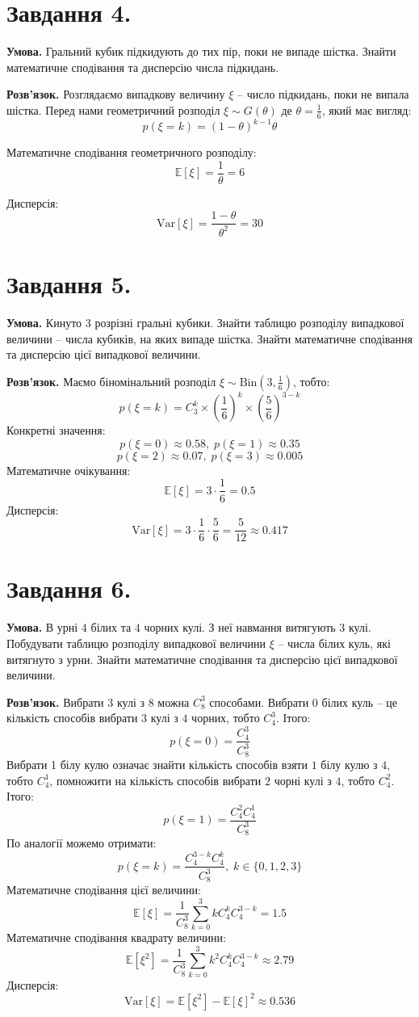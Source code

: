\documentclass[14pt]{extarticle}
\begin{document}
\section*{Завдання 4.}
\textbf{Умова.} Гральний кубик підкидують до тих пір, поки не випаде шістка. Знайти математичне сподівання та дисперсію числа підкидань.

\textbf{Розв'язок.} Розглядаємо випадкову величину $\xi$ -- число підкидань, поки не випала шістка. Перед нами геометричний розподіл $\xi \sim G(\theta)$ де $\theta=\frac{1}{6}$, який має вигляд:
\[
p(\xi = k) = (1-\theta)^{k-1}\theta
\]

Математичне сподівання геометричного розподілу:
\[
\mathbb{E}[\xi] = \frac{1}{\theta} = 6
\]

Дисперсія:
\[
\text{Var}[\xi] = \frac{1-\theta}{\theta^2} = 30
\]

\section*{Завдання 5.}
\textbf{Умова.} Кинуто 3 розрізні гральні кубики. Знайти таблицю розподілу випадкової величини -- числа кубиків, на яких випаде шістка. Знайти математичне сподівання та дисперсію цієї випадкової величини.

\textbf{Розв'язок.} Маємо біномінальний розподіл $\xi \sim \text{Bin}\left(3,\frac{1}{6}\right)$, тобто:
\[
p(\xi = k) = C_3^k \times \left(\frac{1}{6}\right)^k \times \left(\frac{5}{6}\right)^{3-k}
\]
Конкретні значення:
\[
p(\xi=0) \approx 0.58, \; p(\xi=1)\approx 0.35
\]
\[
p(\xi=2) \approx 0.07, \; p(\xi=3)\approx 0.005
\]
Математичне очікування:
\[
\mathbb{E}[\xi] = 3 \cdot \frac{1}{6} = 0.5
\]
Дисперсія:
\[
\text{Var}[\xi] = 3 \cdot \frac{1}{6} \cdot \frac{5}{6} = \frac{5}{12} \approx 0.417
\]

\section*{Завдання 6.}
\textbf{Умова.} В урні 4 білих та 4 чорних кулі. З неї навмання витягують 3 кулі. Побудувати таблицю розподілу випадкової величини $\xi$ – числа білих куль, які витягнуто з урни. Знайти математичне сподівання та дисперсію цієї випадкової величини.

\textbf{Розв'язок.} Вибрати $3$ кулі з $8$ можна $C_8^3$ способами. Вибрати $0$ білих куль -- це кількість способів вибрати $3$ кулі з $4$ чорних, тобто $C_{4}^3$. Ітого:
\[
p(\xi = 0) = \frac{C_{4}^3}{C_{8}^3}
\]
Вибрати 1 білу кулю означає знайти кількість способів взяти $1$ білу кулю з $4$, тобто $C_{4}^1$, помножити на кількість способів вибрати $2$ чорні кулі з $4$, тобто $C_{4}^2$. Ітого:
\[
p(\xi = 1) = \frac{C_{4}^2C_{4}^1}{C_8^3}
\]
По аналогії можемо отримати:
\[
p(\xi = k) = \frac{C_{4}^{3-k}C_4^k}{C_8^3}, \; k \in \{0,1,2,3\}
\]
Математичне сподівання цієї величини:
\[
\mathbb{E}[\xi] = \frac{1}{C_{8}^3}\sum_{k=0}^3 kC_{4}^{k}C_4^{3-k}= 1.5
\]
Математичне сподівання квадрату величини:
\[
\mathbb{E}[\xi^2] = \frac{1}{C_{8}^3}\sum_{k=0}^3 k^2C_{4}^{k}C_4^{3-k}\approx 2.79
\]
Дисперсія:
\[
\text{Var}[\xi] = \mathbb{E}[\xi^2] - \mathbb{E}[\xi]^2 \approx 0.536
\]
\end{document}
